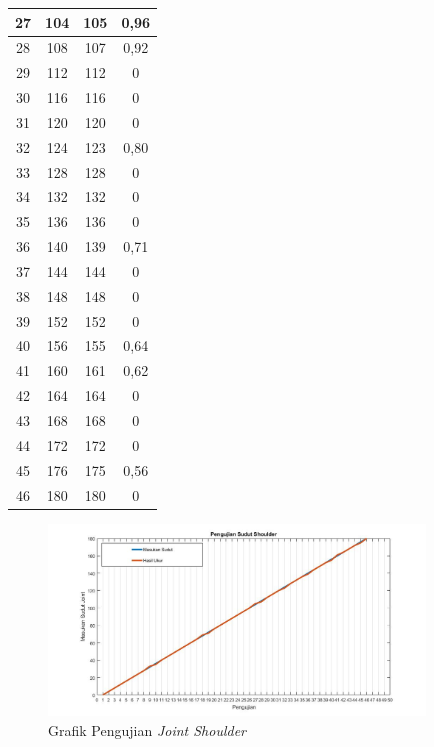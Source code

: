 \begin{table}[!htbp]
\begin{tabular}{|c|c|c|c|}
		27 & 104     & 105      & 0,96 \\ \hline
		28 & 108     & 107      & 0,92 \\ \hline
		29 & 112     & 112      & 0           \\ \hline
		30 & 116     & 116      & 0           \\ \hline
		31 & 120     & 120      & 0           \\ \hline
		32 & 124     & 123      & 0,80 \\ \hline
		33 & 128     & 128      & 0           \\ \hline
		34 & 132     & 132      & 0           \\ \hline
		35 & 136     & 136      & 0           \\ \hline
		36 & 140     & 139      & 0,71 \\ \hline
		37 & 144     & 144      & 0           \\ \hline
		38 & 148     & 148      & 0           \\ \hline
		39 & 152     & 152      & 0           \\ \hline
		40 & 156     & 155      & 0,64 \\ \hline
		41 & 160     & 161      & 0,62      \\ \hline
		42 & 164     & 164      & 0           \\ \hline
		43 & 168     & 168      & 0           \\ \hline
		44 & 172     & 172      & 0           \\ \hline
		45 & 176     & 175      & 0,56 \\ \hline
		46 & 180     & 180      & 0           \\ \hline
	\end{tabular}
\end{table} 
\begin{figure}[H]
	\centering
	\includegraphics[width=10cm]{gambar/pic_jointshoulder.jpg}
	\caption{Grafik Pengujian \textit{Joint Shoulder}}
	\label{pic.jointshoulder}
\end{figure}

